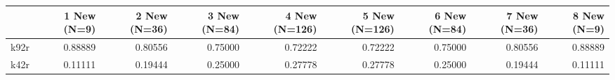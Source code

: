 \begin{tabular}{lrrrrrrrr}
\toprule
 & 1 New (N=9) & 2 New (N=36) & 3 New (N=84) & 4 New (N=126) & 5 New (N=126) & 6 New (N=84) & 7 New (N=36) & 8 New (N=9) \\
\midrule
k92r & 0.88889 & 0.80556 & 0.75000 & 0.72222 & 0.72222 & 0.75000 & 0.80556 & 0.88889 \\
k42r & 0.11111 & 0.19444 & 0.25000 & 0.27778 & 0.27778 & 0.25000 & 0.19444 & 0.11111 \\
\bottomrule
\end{tabular}
